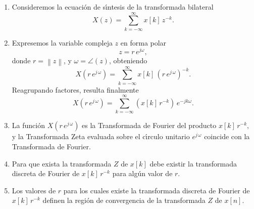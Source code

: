 \begin{enumerate}
  \item Consideremos la ecuaci\'{o}n de s\'{\i}ntesis de la transformada bilateral
    \begin{equation}
       X(z) = \sum_{k=-\infty}^{\infty} x[k] \, z^{-k}.
    \end{equation}

  \item Expresemos la variable compleja $z$ en forma polar
    \begin{equation}
      z = r \, e^{j \omega},
    \end{equation}
    donde $r = \left\| z \right\|$, y $\omega = \angle(z)$,  obteniendo
    \begin{equation}
      X\left( r \, e^{j \, \omega }\right) =
        \sum_{k=-\infty }^{\infty }x\left[ k\right] \, \left( r \, e^{j \, \omega }\right) ^{-k}.
    \end{equation}
    Reagrupando factores, resulta finalmente
    \begin{equation}
      X\left( r \, e^{j \, \omega }\right) =
        \sum_{k=-\infty }^{\infty }\left( x\left[ k\right] \, r^{-k}\right) \, e^{-jk\omega }.
    \end{equation}

  \item La funci\'{o}n $X\left( r \, e^{j \, \omega }\right) $ es la Transformada de
    Fourier del producto $x\left[ k\right] \, r^{-k},$ y la Transformada Zeta
    evaluada sobre el c\'{\i}rculo unitario $e^{j \, \omega }$ coincide con la
    Transformada de Fourier. 

  \item Para que exista la transformada $Z$ de $x[k]$ debe existir la 
    transformada discreta de Fourier de $x[k] \, r^{-k}$ para alg\'{u}n valor 
    de $r$.

  \item Los valores de $r$ para los cuales existe la transformada discreta de Fourier
    de $x[k] \, r^{-k}$ definen la regi\'{o}n de convergencia de la transformada $Z$ de $x[n]$.


\end{enumerate}
